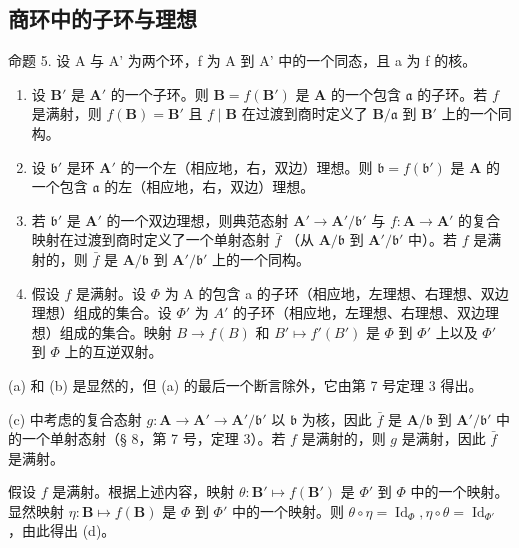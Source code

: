 \subsection{商环中的子环与理想}

命题 5. 设 A 与 A' 为两个环，f 为 A 到 A' 中的一个同态，且 a 为 f 的核。

\begin{enumerate}
\def\labelenumi{(\alph{enumi})}
\item
  设 \(\mathbf{B}'\) 是 \(\mathbf{A}'\) 的一个子环。则 \(\mathbf{B} = f(\mathbf{B}')\) 是 \(\mathbf{A}\) 的一个包含 \(\mathfrak{a}\) 的子环。若 \(f\) 是满射，则 \(f(\mathbf{B}) = \mathbf{B}'\) 且 \(f \mid \mathbf{B}\) 在过渡到商时定义了 \(\mathbf{B}/\mathfrak{a}\) 到 \(\mathbf{B}'\) 上的一个同构。
\item
  设 \(\mathfrak{b}'\) 是环 \(\mathbf{A}'\) 的一个左（相应地，右，双边）理想。则 \(\mathfrak{b} = f(\mathfrak{b}')\) 是 \(\mathbf{A}\) 的一个包含 \(\mathfrak{a}\) 的左（相应地，右，双边）理想。
\item
  若 \(\mathfrak{b}'\) 是 \(\mathbf{A}'\) 的一个双边理想，则典范态射 \(\mathbf{A}' \to \mathbf{A}' / \mathfrak{b}'\) 与 \(f: \mathbf{A} \to \mathbf{A}'\) 的复合映射在过渡到商时定义了一个单射态射 \(\bar{f}\) （从 \(\mathbf{A} / \mathfrak{b}\) 到 \(\mathbf{A}' / \mathfrak{b}'\) 中）。若 \(f\) 是满射的，则 \(\bar{f}\) 是 \(\mathbf{A} / \mathfrak{b}\) 到 \(\mathbf{A}' / \mathfrak{b}'\) 上的一个同构。
\item
  假设 \(f\) 是满射。设 \(\Phi\) 为 A 的包含 a 的子环（相应地，左理想、右理想、双边理想）组成的集合。设 \(\Phi'\) 为 \(A'\) 的子环（相应地，左理想、右理想、双边理想）组成的集合。映射 \(B \to f(B)\) 和 \(B' \mapsto f'(B')\) 是 \(\Phi\) 到 \(\Phi'\) 上以及 \(\Phi'\) 到 \(\Phi\) 上的互逆双射。
\end{enumerate}

(a) 和 (b) 是显然的，但 (a) 的最后一个断言除外，它由第 7 号定理 3 得出。

(c) 中考虑的复合态射 \(g: \mathbf{A} \to \mathbf{A}' \to \mathbf{A}' / \mathfrak{b}'\) 以 \(\mathfrak{b}\) 为核，因此 \(\bar{f}\) 是 \(\mathbf{A} / \mathfrak{b}\) 到 \(\mathbf{A}' / \mathfrak{b}'\) 中的一个单射态射（§ 8，第 7 号，定理 3）。若 \(f\) 是满射的，则 \(g\) 是满射，因此 \(\bar{f}\) 是满射。

假设 \(f\) 是满射。根据上述内容，映射 \(\theta: \mathbf{B}' \mapsto f(\mathbf{B}')\) 是 \(\Phi'\) 到 \(\Phi\) 中的一个映射。显然映射 \(\eta: \mathbf{B} \mapsto f(\mathbf{B})\) 是 \(\Phi\) 到 \(\Phi'\) 中的一个映射。则 \(\theta \circ \eta = \operatorname{Id}_{\Phi}, \eta \circ \theta = \operatorname{Id}_{\Phi'}\) ，由此得出 (d)。

